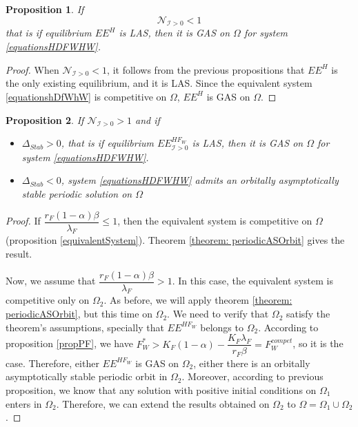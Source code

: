 \documentclass{article}
\newcommand{\lfw}{\lambda_{F}}
\newcommand{\lfw}{\lambda_{F}}
\newcommand{\cI}{\mathcal{I}}
\newtheorem{prop}{Proposition}
\begin{document}
\begin{prop}
If $$\mathcal{N}_{\cI > 0} < 1$$
that is if equilibrium $EE^{H}$ is LAS, then it is GAS on $\Omega$ for system \eqref{equationsHDFWHW}.
\end{prop}

\begin{proof}
When $\mathcal{N}_{\cI > 0} < 1$, it follows from the previous propositions that $EE^{H}$ is the only existing equilibrium, and it is LAS. Since the equivalent system \eqref{equationshDfWhW} is competitive on $\Omega$, $EE^{H}$ is GAS on $\Omega$.
\end{proof}


\begin{prop}
If $\mathcal{N}_{\cI > 0} > 1$ and if 

\begin{itemize}
\item $\Delta_{Stab} > 0$, that is if equilibrium $EE^{HF_W}_{\cI >0}$ is LAS, then it is GAS on $\Omega$ for system \eqref{equationsHDFWHW}.
\item $\Delta_{Stab} < 0$, system \eqref{equationsHDFWHW} admits an orbitally asymptotically stable periodic solution on $\Omega$
\end{itemize}
\end{prop}

\begin{proof}
If $\dfrac{r_F(1-\alpha) \beta}{\lfw} \leq 1$, then the equivalent system is competitive on $\Omega$ (proposition \ref{equivalentSystem}). Theorem \eqref{theorem: periodicASOrbit} gives the result.

Now, we assume that $\dfrac{r_F(1-\alpha) \beta}{\lfw} > 1$. In this case, the equivalent system is competitive only on $\Omega_2$. As before, we will apply theorem \ref{theorem: periodicASOrbit}, but this time on $\Omega_2$. We need to verify that $\Omega_2$ satisfy the theorem's assumptions, specially that $EE^{HF_W}$ belongs to $\Omega_2$. According to proposition \ref{propPF}, we have $F_W^* > K_F(1-\alpha) - \dfrac{K_F \lfw}{r_F \beta} =  F_W^{compet}$, so it is the case. Therefore, either $EE^{HF_W}$ is GAS on $\Omega_2$, either there is an orbitally asymptotically stable periodic orbit in $\Omega_2$. Moreover, according to previous proposition, we know that any solution with positive initial conditions on $\Omega_1$ enters in $\Omega_2$. Therefore, we can extend the results obtained on $\Omega_2$ to $\Omega = \Omega_1 \cup \Omega_2$.

\end{proof}
\end{document}
